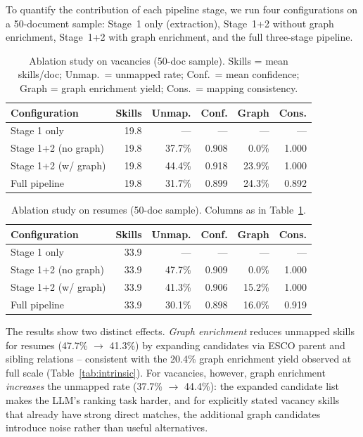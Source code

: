 \documentclass[11pt]{article}
\begin{document}
To quantify the contribution of each pipeline stage, we run four configurations on a 50-document sample: Stage~1 only (extraction), Stage~1+2 without graph enrichment, Stage~1+2 with graph enrichment, and the full three-stage pipeline.

\begin{table}[h]
  \centering
  \small
  \begin{tabular}{@{}lrrrrr@{}}
    \toprule
    \textbf{Configuration} & \textbf{Skills} & \textbf{Unmap.} & \textbf{Conf.} & \textbf{Graph} & \textbf{Cons.} \\
    \midrule
    Stage 1 only & 19.8 & --- & --- & --- & --- \\
    Stage 1+2 (no graph) & 19.8 & 37.7\% & 0.908 & 0.0\% & 1.000 \\
    Stage 1+2 (w/ graph) & 19.8 & 44.4\% & 0.918 & 23.9\% & 1.000 \\
    Full pipeline & 19.8 & 31.7\% & 0.899 & 24.3\% & 0.892 \\
    \bottomrule
  \end{tabular}
  \caption{Ablation study on vacancies (50-doc sample). Skills = mean skills/doc; Unmap.\ = unmapped rate; Conf.\ = mean confidence; Graph = graph enrichment yield; Cons.\ = mapping consistency.}
  \label{tab:ablation-vac}
\end{table}

\begin{table}[h]
  \centering
  \small
  \begin{tabular}{@{}lrrrrr@{}}
    \toprule
    \textbf{Configuration} & \textbf{Skills} & \textbf{Unmap.} & \textbf{Conf.} & \textbf{Graph} & \textbf{Cons.} \\
    \midrule
    Stage 1 only & 33.9 & --- & --- & --- & --- \\
    Stage 1+2 (no graph) & 33.9 & 47.7\% & 0.909 & 0.0\% & 1.000 \\
    Stage 1+2 (w/ graph) & 33.9 & 41.3\% & 0.906 & 15.2\% & 1.000 \\
    Full pipeline & 33.9 & 30.1\% & 0.898 & 16.0\% & 0.919 \\
    \bottomrule
  \end{tabular}
  \caption{Ablation study on resumes (50-doc sample). Columns as in Table~\ref{tab:ablation-vac}.}
  \label{tab:ablation-res}
\end{table}

The results show two distinct effects. \emph{Graph enrichment} reduces unmapped skills for resumes (47.7\% $\to$ 41.3\%) by expanding candidates via ESCO parent and sibling relations -- consistent with the 20.4\% graph enrichment yield observed at full scale (Table~\ref{tab:intrinsic}). For vacancies, however, graph enrichment \emph{increases} the unmapped rate (37.7\% $\to$ 44.4\%): the expanded candidate list makes the LLM's ranking task harder, and for explicitly stated vacancy skills that already have strong direct matches, the additional graph candidates introduce noise rather than useful alternatives.
\end{document}
